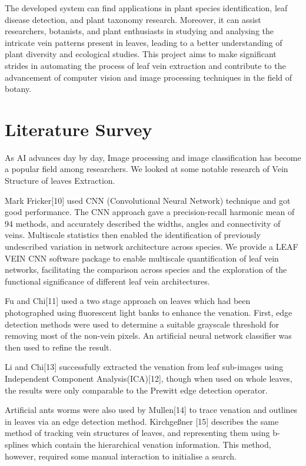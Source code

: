 \documentclass{report}
\begin{document}
{\begin{enumerate}[label=\arabic*.]
    The developed system can find applications in plant species identification, leaf disease detection, and plant taxonomy research. Moreover, it can assist researchers, botanists, and plant enthusiasts in studying and analysing the intricate vein patterns present in leaves, leading to a better understanding of plant diversity and ecological studies. This project aims to make significant strides in automating the process of leaf vein extraction and contribute to the advancement of computer vision and image processing techniques in the field of botany.
\end{enumerate}
\chapter{Literature Survey}
As AI advances day by day, Image processing and image classification
has become a popular field among researchers. We looked at some
notable research of Vein Structure of leaves Extraction.

Mark Fricker[10] used CNN (Convolutional Neural Network) technique
and got good performance. The CNN approach gave a precision-recall
harmonic mean of 94%
methods, and accurately described the widths, angles and connectivity
of veins. Multiscale statistics then enabled the identification of
previously undescribed variation in network architecture across species.
We provide a LEAF VEIN CNN software package to enable multiscale
quantification of leaf vein networks, facilitating the comparison across
species and the exploration of the functional significance of different
leaf vein architectures.

Fu and Chi[11] used a two stage approach on leaves which had been
photographed using fluorescent light banks to enhance the venation.
First, edge detection methods were used to determine a suitable
grayscale threshold for removing most of the non-vein pixels. An
artificial neural network classifier was then used to refine the result.

Li and Chi[13] successfully extracted the venation from leaf sub-images
using Independent Component Analysis(ICA)[12], though when used
on whole leaves, the results were only comparable to the Prewitt edge
detection operator.

Artificial ants worms were also used by Mullen[14] to trace venation
and outlines in leaves via an edge detection method.
Kirchgeßner [15] describes the same method of tracking vein structures
of leaves, and representing them using b-splines which contain the hierarchical venation information. This method, however, required
some manual interaction to initialise a search.

}
\end{document}
